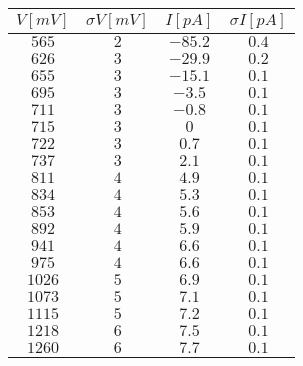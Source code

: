 \begin{tabular}{cccc}
\hline
	$V[mV]$ & $\sigma V[mV]$ & $I[pA]$ & $\sigma I[pA]$\\ 
\hline
	$565$ & $2$ & $-85.2$ & $0.4$ \\
	$626$ & $3$ & $-29.9$ & $0.2$ \\
	$655$ & $3$ & $-15.1$ & $0.1$ \\
	$695$ & $3$ & $-3.5$ & $0.1$ \\
	$711$ & $3$ & $-0.8$ & $0.1$ \\
	$715$ & $3$ & $0$ & $0.1$ \\
	$722$ & $3$ & $0.7$ & $0.1$ \\
	$737$ & $3$ & $2.1$ & $0.1$ \\
	$811$ & $4$ & $4.9$ & $0.1$ \\
	$834$ & $4$ & $5.3$ & $0.1$ \\
	$853$ & $4$ & $5.6$ & $0.1$ \\
	$892$ & $4$ & $5.9$ & $0.1$ \\
	$941$ & $4$ & $6.6$ & $0.1$ \\
	$975$ & $4$ & $6.6$ & $0.1$ \\
	$1026$ & $5$ & $6.9$ & $0.1$ \\
	$1073$ & $5$ & $7.1$ & $0.1$ \\
	$1115$ & $5$ & $7.2$ & $0.1$ \\
	$1218$ & $6$ & $7.5$ & $0.1$ \\
	$1260$ & $6$ & $7.7$ & $0.1$ \\
\hline
\end{tabular}
